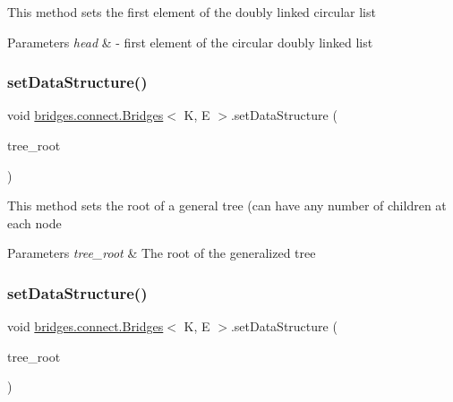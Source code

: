 This method sets the first element of the doubly linked circular list


\begin{DoxyParams}{Parameters}
{\em head} & -\/ first element of the circular doubly linked list \\
\hline
\end{DoxyParams}
\hypertarget{classbridges_1_1connect_1_1_bridges_a0788905a16b9a8f3deb0b4a344f2b42d}{}\label{classbridges_1_1connect_1_1_bridges_a0788905a16b9a8f3deb0b4a344f2b42d} 
\subsubsection{\texorpdfstring{set\+Data\+Structure()}{setDataStructure()}\hspace{0.1cm}{\footnotesize\ttfamily [7/12]}}
{\footnotesize\ttfamily void \hyperlink{classbridges_1_1connect_1_1_bridges}{bridges.\+connect.\+Bridges}$<$ K, E $>$.set\+Data\+Structure (\begin{DoxyParamCaption}\item[{\hyperlink{classbridges_1_1base_1_1_tree_element}{Tree\+Element}$<$ E $>$}]{tree\+\_\+root }\end{DoxyParamCaption})}

This method sets the root of a general tree (can have any number of children at each node


\begin{DoxyParams}{Parameters}
{\em tree\+\_\+root} & The root of the generalized tree \\
\hline
\end{DoxyParams}
\hypertarget{classbridges_1_1connect_1_1_bridges_a02a3d74b381473b5d97a8f8194df9b40}{}\label{classbridges_1_1connect_1_1_bridges_a02a3d74b381473b5d97a8f8194df9b40} 
\subsubsection{\texorpdfstring{set\+Data\+Structure()}{setDataStructure()}\hspace{0.1cm}{\footnotesize\ttfamily [8/12]}}
{\footnotesize\ttfamily void \hyperlink{classbridges_1_1connect_1_1_bridges}{bridges.\+connect.\+Bridges}$<$ K, E $>$.set\+Data\+Structure (\begin{DoxyParamCaption}\item[{\hyperlink{classbridges_1_1base_1_1_bin_tree_element}{Bin\+Tree\+Element}$<$ E $>$}]{tree\+\_\+root }\end{DoxyParamCaption})}


